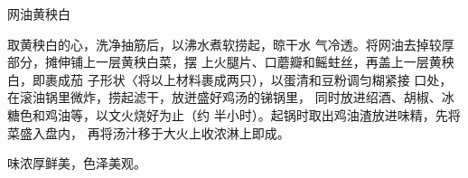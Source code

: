 \begin{recipe}{网油黄秧白}

\ingredients






\cooking

取黄秧白的心，洗净抽筋后，以沸水煮软捞起，晾干水 气冷透。将网油去掉较厚部分，摊伸铺上一层黄秧白菜，摆 上火腿片、口蘑瓣和鳐蛀丝，再盖上一层黄秧白，即裹成茄 子形状〈将以上材料裹成两只），以蛋清和豆粉调匀糊紧接 口处，在滚油锅里微炸，捞起滤干，放迸盛好鸡汤的锑锅里， 同时放进绍酒、胡椒、冰糖色和鸡油等，以文火烧好为止（约 半小时）。起锅时取出鸡油渣放进味精，先将菜盛入盘内， 再将汤汁移于大火上收浓淋上即成。

\notes

味浓厚鲜美，色泽美观。

\end{recipe}

